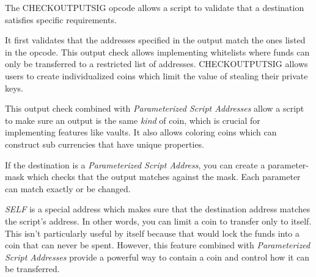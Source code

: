 \documentclass{article}
\begin{document}
\begin{center}
\end{center}

The CHECKOUTPUTSIG opcode allows a script to validate that a destination satisfies
specific requirements.

It first validates that the addresses specified in the output match the ones
listed in the opcode. This output check allows implementing whitelists where funds
can only be transferred to a restricted list of addresses. CHECKOUTPUTSIG allows
users to create individualized coins which limit the value of stealing their private keys.

This output check combined with \emph{Parameterized Script Addresses}
allow a script to make sure an output is the same \emph{kind} of coin, which is crucial
for implementing features like vaults. It also allows coloring coins which can
construct sub currencies that have unique properties.

If the destination is a \emph{Parameterized Script Address}, you can create a parameter-mask
which checks that the output matches against the mask. Each parameter can match
exactly or be changed.

\emph{SELF} is a special address which makes sure that the destination address
matches the script's address. In other words, you can limit a coin to transfer
only to itself. This isn't particularly useful by itself because that would lock
the funds into a coin that can never be spent. However, this feature combined
with \emph{Parameterized Script Addresses} provide a powerful way to contain a
coin and control how it can be transferred.
\end{document}
